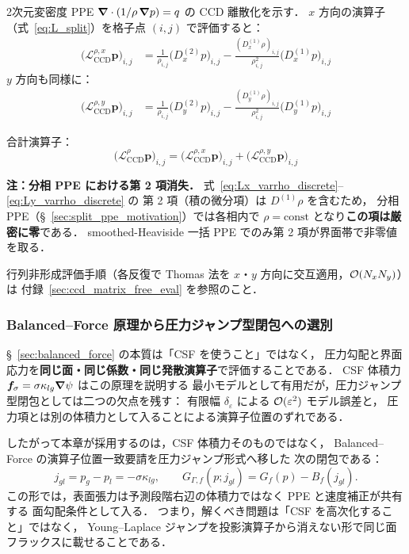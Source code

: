 2次元変密度 PPE $\bm{\nabla}\cdot(1/\rho\,\bm{\nabla} p) = q$ の CCD 離散化を示す．
$x$ 方向の演算子（式~\eqref{eq:L_split}）を格子点 $(i,j)$ で評価すると：
\begin{align}
  \bigl(\mathcal{L}_{\mathrm{CCD}}^{\rho,x}\bm{p}\bigr)_{i,j}
  &= \frac{1}{\rho_{i,j}}\bigl(D_x^{(2)} p\bigr)_{i,j}
  - \frac{(D_x^{(1)}\rho)_{i,j}}{\rho_{i,j}^2}\bigl(D_x^{(1)} p\bigr)_{i,j}
  \label{eq:Lx_varrho_discrete}
\end{align}
$y$ 方向も同様に：
\begin{align}
  \bigl(\mathcal{L}_{\mathrm{CCD}}^{\rho,y}\bm{p}\bigr)_{i,j}
  &= \frac{1}{\rho_{i,j}}\bigl(D_y^{(2)} p\bigr)_{i,j}
  - \frac{(D_y^{(1)}\rho)_{i,j}}{\rho_{i,j}^2}\bigl(D_y^{(1)} p\bigr)_{i,j}
  \label{eq:Ly_varrho_discrete}
\end{align}

合計演算子：
\begin{equation}
  \bigl(\mathcal{L}_{\mathrm{CCD}}^{\rho}\bm{p}\bigr)_{i,j}
  = \bigl(\mathcal{L}_{\mathrm{CCD}}^{\rho,x}\bm{p}\bigr)_{i,j}
  + \bigl(\mathcal{L}_{\mathrm{CCD}}^{\rho,y}\bm{p}\bigr)_{i,j}
  \label{eq:L_CCD_2d_full}
\end{equation}

\noindent\textbf{注：分相 PPE における第 2 項消失．}
式~\eqref{eq:Lx_varrho_discrete}--\eqref{eq:Ly_varrho_discrete} の
第 2 項（積の微分項）は $D^{(1)}\rho$ を含むため，
分相 PPE（§~\ref{sec:split_ppe_motivation}）では各相内で $\rho=\mathrm{const}$
となり\textbf{この項は厳密に零}である．
smoothed-Heaviside 一括 PPE でのみ第 2 項が界面帯で非零値を取る．

行列非形成評価手順（各反復で Thomas 法を $x$・$y$ 方向に交互適用，$\mathcal{O}(N_x N_y)$）は
付録~\ref{sec:ccd_matrix_free_eval} を参照のこと．

\subsubsection{Balanced--Force 原理から圧力ジャンプ型閉包への選別}
\label{sec:ccd_balanced_force}

§~\ref{sec:balanced_force} の本質は「CSF を使うこと」ではなく，
圧力勾配と界面応力を\textbf{同じ面・同じ係数・同じ発散演算子}で評価することである．
CSF 体積力
$\bm f_\sigma=\sigma\kappa_{lg}\bm{\nabla}\psi$ はこの原理を説明する
最小モデルとして有用だが，圧力ジャンプ型閉包としては二つの欠点を残す：
有限幅 $\delta_\varepsilon$ による $\mathcal{O}(\varepsilon^2)$ モデル誤差と，
圧力項とは別の体積力として入ることによる演算子位置のずれである．

したがって本章が採用するのは，CSF 体積力そのものではなく，
Balanced--Force の演算子位置一致要請を圧力ジャンプ形式へ移した
次の閉包である：
\[
  j_{gl}=p_g-p_l=-\sigma\kappa_{lg},
  \qquad
  G_{\Gamma,f}(p;j_{gl})=G_f(p)-B_f(j_{gl}).
\]
この形では，表面張力は予測段階右辺の体積力ではなく PPE と速度補正が共有する
面勾配条件として入る．
つまり，解くべき問題は「CSF を高次化すること」ではなく，
Young--Laplace ジャンプを投影演算子から消えない形で同じ面フラックスに載せることである．

